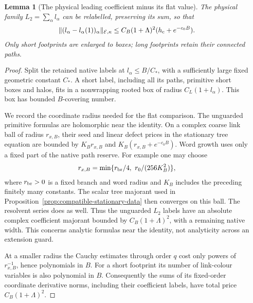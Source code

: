 \documentclass[11pt,reqno]{amsart}
\numberwithin{equation}{section}
\newtheorem{lemma}[theorem]{Lemma}
\theoremstyle{definition}
\theoremstyle{remark}
\begin{document}
\begin{lemma}[The physical leading coefficient minus its flat value]
\label{lem:connected-physical-flat-subtraction}
The physical family \(L_2=\sum_\alpha l_\alpha\)
can be relabelled, preserving its sum, so that
\begin{equation}
       \|(l_\alpha-l_\alpha(1))_\alpha\|_{\mathcal E,\kappa}
             \le C_B(1+\Lambda)^2(h_{\rm c}+e^{-c_0B}).
 \label{eq:connected-physical-flat-gain}
\end{equation}
Only short footprints are enlarged to boxes;
long footprints retain their connected paths.
\end{lemma}
\begin{proof}
Split the retained native labels at
\(l_\alpha\le B/C_*\), with a sufficiently
large fixed geometric constant \(C_*\).
A short label, including all its paths,
primitive short boxes and halos, fits in
a nonwrapping rooted box of radius
\(C_L(1+l_\alpha)\).
This box has bounded \(B\)-covering number.

We record the coordinate radius needed
for the flat comparison.
The unguarded primitive formulas are
holomorphic near the identity.
On a complex coarse link ball of radius
\(r_{x,B}\), their seed and linear defect
prices in the stationary tree equation
are bounded by \(K_Br_{x,B}\) and
\(K_B(r_{x,B}+e^{-c_0B})\).
Word growth uses only a fixed part of
the native path reserve.
For example one may choose
\begin{equation}
       r_{x,B}
            =\min\{r_{\rm br}/4,\ r_0/(256K_B^2)\},
 \label{eq:connected-physical-complex-radius}
\end{equation}
where \(r_{\rm br}>0\) is a fixed branch
and word radius and \(K_B\) includes
the preceding finitely many constants.
The scalar tree majorant used in
Proposition~\ref{prop:compatible-stationary-data}
then converges on this ball.
The resolvent series does as well.
Thus the unguarded \(L_2\) labels have
an absolute complex coefficient majorant
bounded by \(C_B(1+\Lambda)^2\), with
a remaining native width.
This concerns analytic formulas near
the identity, not analyticity across
an extension guard.

At a smaller radius the Cauchy estimates
through order \(q\) cost only powers
of \(r_{x,B}^{-1}\), hence polynomials
in \(B\).
For a short footprint its number of
link-colour variables is also polynomial
in \(B\). Consequently the sums of its
fixed-order coordinate derivative norms,
including their coefficient labels,
have total price \(C_B(1+\Lambda)^2\).


\end{proof}
\end{document}
